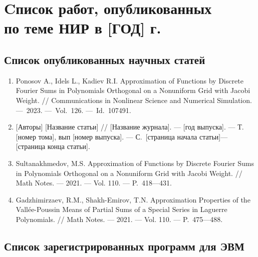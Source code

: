 \chapter{Cписок работ, опубликованных \texorpdfstring{\\ }{} по теме НИР в [ГОД] г.}


\section*{Список опубликованных научных статей}

\begin{enumerate}

    \item
    \foreignlanguage{english}{%
        Ponosov A., Idels L., Kadiev R.I.
        Approximation of Functions by Discrete Fourier Sums in Polynomials Orthogonal on a Nonuniform Grid with Jacobi Weight.
        //
        Communications in Nonlinear Science and Numerical Simulation. 
        ---~2023.
        ---~Vol.~126.
        ---~Id.~107491.
    }
    \item
    {[Авторы]}
    [Название статьи]
    //
    [Название журнала].
    --- [год выпуска].
    --- Т. [номер тома], вып [номер выпуска].
    --- С.~[страница начала статьи]---[страница конца статьи].


    \item
    \foreignlanguage{english}{%
        Sultanakhmedov, M.S.
        Approximation of Functions by Discrete Fourier Sums in Polynomials Orthogonal on a Nonuniform Grid with Jacobi Weight.
        //
        Math Notes. 
        --- 2021.
        --- Vol. 110.
        --- P.~418---431.
    }%

    \item
    \foreignlanguage{english}{%
        Gadzhimirzaev, R.M., Shakh-Emirov, T.N.
        Approximation Properties of the Vallée-Pous\-sin Means of Partial Sums of a Special Series in Laguerre Polynomials.
        //
        Math Notes. 
        --- 2021.
        --- Vol. 110.
        --- P.~475---488.
    }%

\end{enumerate}

\section*{Список зарегистрированных программ для ЭВМ}

